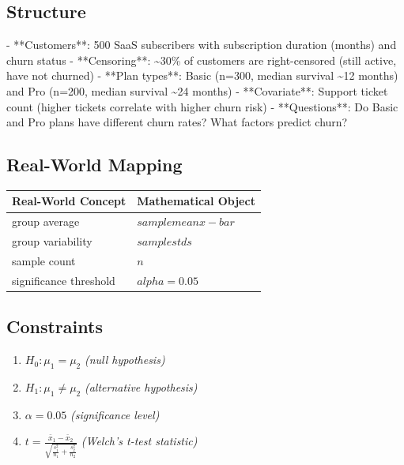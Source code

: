 \documentclass[11pt, a4paper]{article}
\begin{document}
\subsection{Structure}

- **Customers**: 500 SaaS subscribers with subscription duration (months) and churn status
- **Censoring**: \textasciitilde{}30\% of customers are right-censored (still active, have not churned)
- **Plan types**: Basic (n=300, median survival \textasciitilde{}12 months) and Pro (n=200, median survival \textasciitilde{}24 months)
- **Covariate**: Support ticket count (higher tickets correlate with higher churn risk)
- **Questions**: Do Basic and Pro plans have different churn rates? What factors predict churn?

\subsection{Real-World Mapping}

\begin{longtable}{ll}
\toprule
\textbf{Real-World Concept} & \textbf{Mathematical Object} \\
\midrule
\endhead
group average & $sample mean x-bar$ \\
group variability & $sample std s$ \\
sample count & $n$ \\
significance threshold & $alpha = 0.05$ \\
\bottomrule
\end{longtable}

\subsection{Constraints}

\begin{enumerate}
  \item $H_0: \mu_1 = \mu_2$
  \hfill \textit{(null hypothesis)}
  \item $H_1: \mu_1 \neq \mu_2$
  \hfill \textit{(alternative hypothesis)}
  \item $\alpha = 0.05$
  \hfill \textit{(significance level)}
  \item $t = \frac{\bar{x}_1 - \bar{x}_2}{\sqrt{\frac{s_1^2}{n_1} + \frac{s_2^2}{n_2}}}$
  \hfill \textit{(Welch's t-test statistic)}
\end{enumerate}
\end{document}
